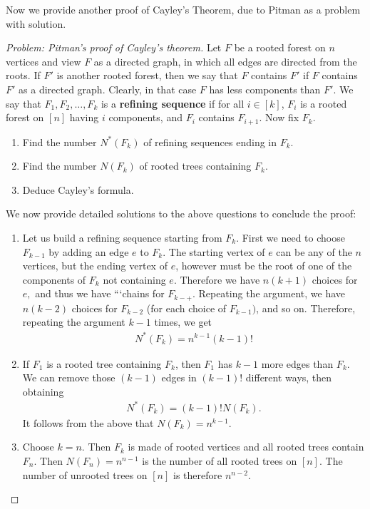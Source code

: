\documentclass[12pt,a4paper]{article}
\theoremstyle{definition}
\begin{document}
\newpage
Now we provide another proof of Cayley's Theorem,  due to Pitman as a problem with solution. 
\begin{proof}[Problem: Pitman's proof of Cayley's theorem] Let $F$ be a rooted forest on $n$ vertices and view $F$ as a directed graph, in which all edges are directed from the roots. If $F'$ is another rooted forest,  then we say that $F$ contains $F'$ if $F$ contains $F'$ as a directed graph. Clearly, in that case $F$ has less components than $F'$. We say that $F_1, F_2, \dots ,  F_k$ is a \textbf{refining sequence} if for all $i \in [k]$,  $F_i$ is a rooted forest on $[n]$ having $i$ components, and $F_i$ contains $F_{i+1}.$ Now fix $F_k$. 
\begin{enumerate}[label=(\alph*)]
\item Find the number $N^*(F_k)$ of refining sequences ending in $F_k$.
\item Find the number $N(F_k)$ of rooted trees containing $F_k$.
\item Deduce Cayley's formula. 

\end{enumerate}
We now provide detailed solutions to the above questions to conclude the proof:
\begin{enumerate}[label=(\alph*)]
\item Let us build a refining sequence starting from $F_k$. First we need to choose $F_{k-1}$ by adding an edge $e$ to $F_k$. The starting vertex of $e$ can be  any of the $n$ vertices, but the ending vertex of $e$,  however must be the root of one of the components of $F_k$ not containing $e$. Therefore we have $n(k+1)$ choices for $e,$ and thus we have ```chains for $F_{k-+}$. Repeating the argument, we have $n(k-2)$ choices for $F_{k-2}$ (for each choice of $F_{k-1})$,  and so on. Therefore,  repeating the argument $k-1$ times,  we get 
\begin{align*}
N^*(F_k)=n^{k-1}(k-1)!
\end{align*}
\item If $F_1$ is a rooted tree containing $F_k$, then $F_1$ has $k-1$ more edges than $F_k$. We can remove those $(k-1)$ edges in $(k-1)!$ different ways, then obtaining 
\begin{align*}
N^*(F_k)=(k-1)! N(F_k).
\end{align*}
It follows from the above that $N(F_k)=n^{k-1}.$ 
\item Choose $k=n$. Then $F_k$ is made of rooted vertices and all rooted trees contain $F_n$. Then $N(F_n)=n^{n-1}$ is the number of all rooted trees on $[n]$. The number of unrooted trees on $[n]$ is therefore $n^{n-2}.$ 
\end{enumerate}
\end{proof}
\end{document}
